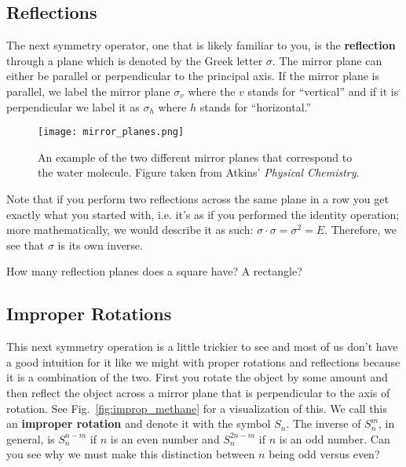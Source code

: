 
        \subsection*{Reflections} %
        \label{sub:reflection}

        The next symmetry operator, one that is likely familiar to you, is the \textbf{reflection} through a plane which is denoted by the Greek letter $\sigma.$ The mirror plane can either be parallel or perpendicular to the principal axis. If the mirror plane is parallel, we label the mirror plane $\sigma_v$ where the $v$ stands for ``vertical'' and if it is perpendicular we label it as $\sigma_h$ where $h$ stands for ``horizontal.''

        \begin{figure}[ht]
            \centering
            \texttt{[image: mirror\_planes.png]}
            \caption{An example of the two different mirror planes that correspond to the water molecule. Figure taken from Atkins' \emph{Physical Chemistry}.\cite{atkins2014physical}}
            \label{fig:mirros}
        \end{figure}

        Note that if you perform two reflections across the same plane in a row you get exactly what you started with, i.e. it's as if you performed the identity operation; more mathematically, we would describe it as such: $\sigma \cdot \sigma = \sigma^2 = E$. Therefore, we see that $\sigma$ is its own inverse.

        \begin{exercise}
            How many reflection planes does a square have? A rectangle?
        \end{exercise}

        \subsection*{Improper Rotations} %
        \label{sub:improp}

        This next symmetry operation is a little trickier to see and most of us don't have a good intuition for it like we might with proper rotations and reflections because it is a combination of the two. First you rotate the object by some amount and then reflect the object across a mirror plane that is perpendicular to the axis of rotation. See Fig.~\ref{fig:improp_methane} for a visualization of this. We call this an \textbf{improper rotation} and denote it with the symbol $S_n$. The inverse of $S^m_n$, in general, is $S^{n-m}_n$ if $n$ is an even number and $S^{2n-m}_n$ if $n$ is an odd number. Can you see why we must make this distinction between $n$ being odd versus even?

